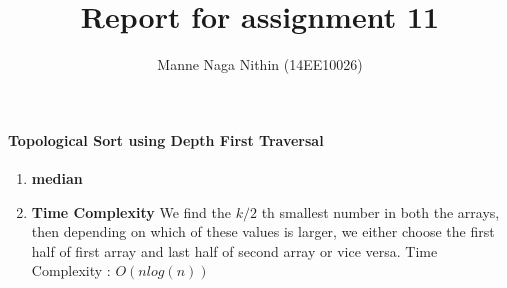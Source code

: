 \documentclass[a4paper,11pt]{article}
\title{Report for assignment 11}
\author{Manne Naga Nithin (14EE10026)}
\begin{document}
\maketitle
\paragraph{Topological Sort using Depth First Traversal}
\begin{enumerate}

 \item \textbf{median}\newline

 \item \textbf{Time Complexity}\newline
 We find the $k/2$ th smallest number in both the arrays, then depending on which of these values is larger, we either choose the first half of first array and last half of second array or vice versa.\newline
 Time Complexity : $O(nlog(n))$

 
 


\end{enumerate}
\end{document}
